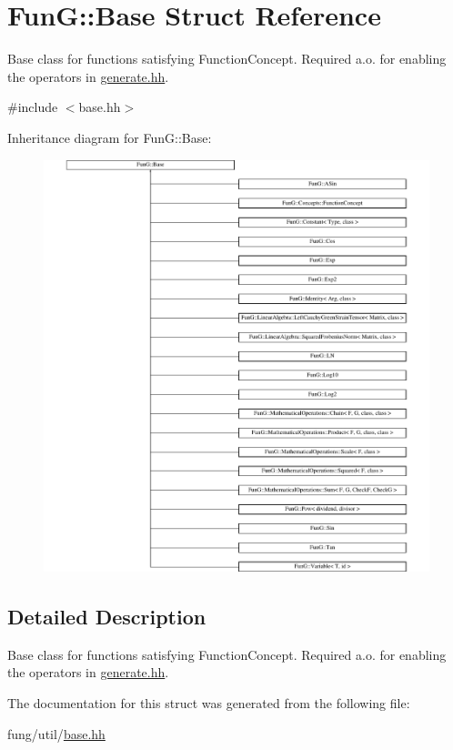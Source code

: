 \hypertarget{structFunG_1_1Base}{}\section{Fun\+G\+:\+:Base Struct Reference}
\label{structFunG_1_1Base}


Base class for functions satisfying Function\+Concept. Required a.\+o. for enabling the operators in \hyperlink{generate_8hh}{generate.\+hh}.  




{\ttfamily \#include $<$base.\+hh$>$}

Inheritance diagram for Fun\+G\+:\+:Base\+:\begin{figure}[H]
\begin{center}
\leavevmode
\includegraphics[height=12.000000cm]{structFunG_1_1Base}
\end{center}
\end{figure}


\subsection{Detailed Description}
Base class for functions satisfying Function\+Concept. Required a.\+o. for enabling the operators in \hyperlink{generate_8hh}{generate.\+hh}. 

The documentation for this struct was generated from the following file\+:\begin{DoxyCompactItemize}
\item 
fung/util/\hyperlink{base_8hh}{base.\+hh}\end{DoxyCompactItemize}
